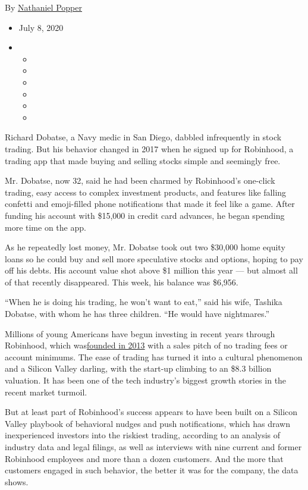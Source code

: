 By
\href{https://www.nytimes3xbfgragh.onion/by/nathaniel-popper}{Nathaniel
Popper}

\begin{itemize}
\item
  July 8, 2020
\item
  \begin{itemize}
  \item
  \item
  \item
  \item
  \item
  \item
  \end{itemize}
\end{itemize}

Richard Dobatse, a Navy medic in San Diego, dabbled infrequently in
stock trading. But his behavior changed in 2017 when he signed up for
Robinhood, a trading app that made buying and selling stocks simple and
seemingly free.

Mr. Dobatse, now 32, said he had been charmed by Robinhood's one-click
trading, easy access to complex investment products, and features like
falling confetti and emoji-filled phone notifications that made it feel
like a game. After funding his account with \$15,000 in credit card
advances, he began spending more time on the app.

As he repeatedly lost money, Mr. Dobatse took out two \$30,000 home
equity loans so he could buy and sell more speculative stocks and
options, hoping to pay off his debts. His account value shot above \$1
million this year --- but almost all of that recently disappeared. This
week, his balance was \$6,956.

``When he is doing his trading, he won't want to eat,'' said his wife,
Tashika Dobatse, with whom he has three children. ``He would have
nightmares.''

Millions of young Americans have begun investing in recent years through
Robinhood, which
was\href{https://www.nytimes3xbfgragh.onion/2017/02/18/business/robinhood-stock-trading-app.html}{founded
in 2013} with a sales pitch of no trading fees or account minimums. The
ease of trading has turned it into a cultural phenomenon and a Silicon
Valley darling, with the start-up climbing to an \$8.3 billion
valuation. It has been one of the tech industry's biggest growth stories
in the recent market turmoil.

But at least part of Robinhood's success appears to have been built on a
Silicon Valley playbook of behavioral nudges and push notifications,
which has drawn inexperienced investors into the riskiest trading,
according to an analysis of industry data and legal filings, as well as
interviews with nine current and former Robinhood employees and more
than a dozen customers. And the more that customers engaged in such
behavior, the better it was for the company, the data shows.

